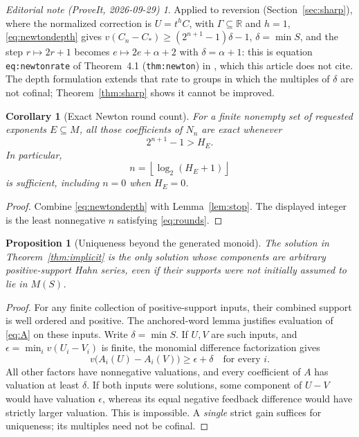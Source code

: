 \documentclass[11pt,a4paper]{article}
\newtheorem{proposition}[theorem]{Proposition}
\newtheorem{corollary}[theorem]{Corollary}
\theoremstyle{definition}
\theoremstyle{remark}
\newtheorem*{ednote}{Editorial note (ProveIt, 2026-09-29)}
\newcommand{\R}{\mathbb R}
\begin{document}
\begin{ednote}\label{ed:newton-rate}
Applied to reversion (Section~\ref{sec:sharp}), where the normalized
correction is $U=t^hC$, with $\Gamma\subseteq\R$ and $h=1$,
\eqref{eq:newtondepth} gives $v(C_n-C_*)\ge(2^{n+1}-1)\delta-1$,
$\delta=\min S$, and the step
$r\mapsto2r+1$ becomes $e\mapsto2e+\alpha+2$ with $\delta=\alpha+1$: this is
equation \texttt{eq:newtonrate} of Theorem~4.1 (\texttt{thm:newton}) in
,
which this article does not cite. The depth formulation extends that rate
to groups in which the multiples of $\delta$ are not cofinal;
Theorem~\ref{thm:sharp} shows it cannot be improved.
\end{ednote}

\begin{corollary}[Exact Newton round count]\label{cor:rounds}
For a finite nonempty set of requested exponents $E\subseteq M$, all those
coefficients of $N_n$ are exact whenever
\begin{equation}\label{eq:rounds}
 2^{n+1}-1>H_E.
\end{equation}
In particular,
\[
 n=\left\lfloor\log_2(H_E+1)\right\rfloor
\]
is sufficient, including $n=0$ when $H_E=0$.
\end{corollary}
\begin{proof}
Combine \eqref{eq:newtondepth} with Lemma~\ref{lem:stop}. The displayed
integer is the least nonnegative $n$ satisfying \eqref{eq:rounds}.
\end{proof}

\begin{proposition}[Uniqueness beyond the generated monoid]
\label{prop:allpositive}
The solution in Theorem~\ref{thm:implicit} is the only solution whose
components are arbitrary positive-support Hahn series, even if their
supports were not initially assumed to lie in $M(S)$.
\end{proposition}
\begin{proof}
For any finite collection of positive-support inputs, their combined
support is well ordered and positive. The anchored-word lemma justifies
evaluation of \eqref{eq:A} on these inputs. Write $\delta=\min S$.
If $U,V$ are such inputs, and
$\epsilon=\min_i v(U_i-V_i)$ is finite, the monomial difference
factorization gives
\[
 v\bigl(A_i(U)-A_i(V)\bigr)\ge\epsilon+\delta
 \quad\text{for every }i.
\]
All other factors have nonnegative valuations, and every coefficient of
$A$ has valuation at least $\delta$. If both inputs were solutions, some
component of $U-V$ would have valuation $\epsilon$, whereas its equal
negative feedback difference would have strictly larger valuation.
This is impossible. A \emph{single} strict gain suffices for uniqueness;
its multiples need not be cofinal.
\end{proof}
\end{document}
